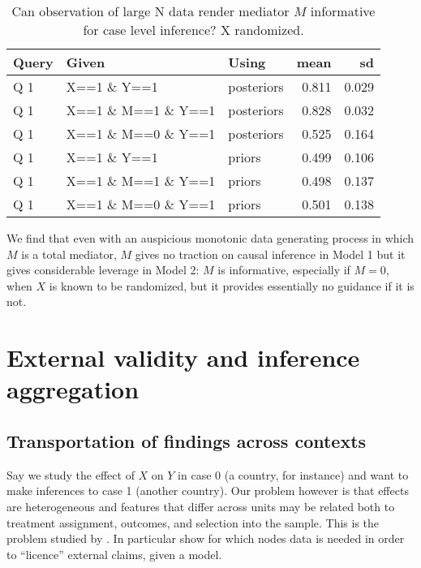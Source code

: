 \documentclass[
  12pt,
]{book}
\begin{document}
\begin{table}

\caption{\label{tab:unnamed-chunk-109}Can observation of large N data render mediator $M$ informative for case level inference? X randomized.}
\centering
\begin{tabular}[t]{l|l|l|r|r}
\hline
Query & Given & Using & mean & sd\\
\hline
Q 1 & X==1 \& Y==1 & posteriors & 0.811 & 0.029\\
\hline
Q 1 & X==1 \& M==1 \& Y==1 & posteriors & 0.828 & 0.032\\
\hline
Q 1 & X==1 \& M==0 \& Y==1 & posteriors & 0.525 & 0.164\\
\hline
Q 1 & X==1 \& Y==1 & priors & 0.499 & 0.106\\
\hline
Q 1 & X==1 \& M==1 \& Y==1 & priors & 0.498 & 0.137\\
\hline
Q 1 & X==1 \& M==0 \& Y==1 & priors & 0.501 & 0.138\\
\hline
\end{tabular}
\end{table}

We find that even with an auspicious monotonic data generating process in which \(M\) is a total mediator, \(M\) gives no traction on causal inference in Model 1 but it gives considerable leverage in Model 2: \(M\) is informative, especially if \(M=0\), when \(X\) is known to be randomized, but it provides essentially no guidance if it is not.

\hypertarget{external-validity-and-inference-aggregation}{%
\chapter{External validity and inference aggregation}\label{external-validity-and-inference-aggregation}}

\hypertarget{transportation-of-findings-across-contexts}{%
\section{Transportation of findings across contexts}\label{transportation-of-findings-across-contexts}}

Say we study the effect of \(X\) on \(Y\) in case 0 (a country, for instance) and want to make inferences to case 1 (another country). Our problem however is that effects are heterogeneous and features that differ across units may be related both to treatment assignment, outcomes, and selection into the sample. This is the problem studied by \citet{pearl2014external}. In particular \citet{pearl2014external} show for which nodes data is needed in order to ``licence'' external claims, given a model.
\end{document}
